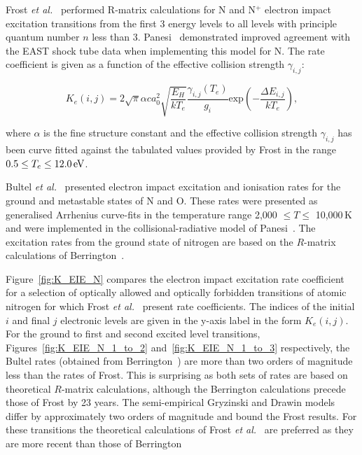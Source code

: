 {Frost \textit{et al.}~\cite{FAS+1998} performed R-matrix calculations for N and N$^+$ electron impact excitation transitions from the first 3 energy levels to all levels with principle quantum number $n$ less than 3.
Panesi~\cite{panesi_2008B} demonstrated improved agreement with the EAST shock tube data when implementing this model for N.
The rate coefficient is given as a function of the effective collision strength $\gamma_{i,j}$:

\begin{equation}
 K_e (i,j) = 2 \sqrt{\pi} \alpha c a_{0}^2 \sqrt{\frac{E_H}{kT_e}} \frac{\gamma_{i,j}(T_{e})}{g_i} \text{exp} \left ( - \frac{\Delta E_{i,j}}{kT_e} \right ),
\end{equation}

\noindent where $\alpha$ is the fine structure constant and the effective collision strength $\gamma_{i,j}$ has been curve fitted against the tabulated values provided by Frost in the range $0.5 \leq T_e \leq 12.0\text{\,eV}$.

\par

Bultel \textit{et al.}~\cite{BBB+2006} presented electron impact excitation and ionisation rates for the ground and metastable states of N and O.
These rates were presented as generalised Arrhenius curve-fits in the temperature range 2,000 $\leq T \leq$ 10,000\,K and were implemented in the collisional-radiative model of Panesi~\cite{panesi_phd}.
The excitation rates from the ground state of nitrogen are based on the $R$-matrix calculations of Berrington~\cite{BBR1975}.

\par

Figure~\ref{fig:K_EIE_N} compares the electron impact excitation rate coefficient for a selection of optically allowed and optically forbidden transitions of atomic nitrogen for which Frost \textit{et al.}~\cite{FAS+1998} present rate coefficients.
The indices of the initial $i$ and final $j$ electronic levels are given in the y-axis label in the form $K_e(i,j)$.
For the ground to first and second excited level transitions, Figures~\ref{fig:K_EIE_N_1_to_2} and~\ref{fig:K_EIE_N_1_to_3} respectively, the Bultel rates (obtained from Berrington~\cite{BBR1975}) are more than two orders of magnitude less than the rates of Frost.
This is surprising as both sets of rates are based on theoretical $R$-matrix calculations, although the Berrington calculations precede those of Frost by 23 years.
The semi-empirical Gryzinski and Drawin models differ by approximately two orders of magnitude and bound the Frost results.
For these transitions the theoretical calculations of Frost \textit{et al.}~\cite{FAS+1998} are preferred as they are more recent than those of Berrington~\cite{BBR1975}

}

